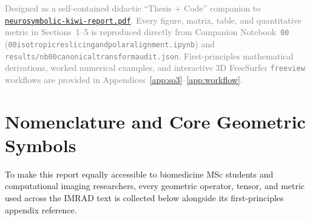 \documentclass[10pt,a4paper]{article}
\renewcommand{\_}{\origunderscore\allowbreak}
\newcommand{\ghblob}{https://github.com/arvidl/BMED365-2027/blob/main}
\newcommand{\repodir}{Lab4-Comp-Imag/Kiwi-challenge/docs/neurosymbolic-report}
\newcommand{\natrep}{\href{\ghblob/\repodir/neurosymbolic-kiwi-report.pdf}{\texttt{neurosymbolic-\allowbreak kiwi-\allowbreak report.pdf}}}
\begin{document}
\vfill
\begin{center}
\footnotesize\textcolor{gray}{
Designed as a self-contained didactic ``Thesis + Code'' companion to \natrep{}. Every figure, matrix, table, and quantitative metric in Sections~1--5 is reproduced directly from Companion Notebook~\texttt{00} (\texttt{00\_isotropic\_reslicing\_and\_polar\_alignment.ipynb}) and \texttt{results/nb00\_canonical\_transform\_audit.json}. First-principles mathematical derivations, worked numerical examples, and interactive 3D FreeSurfer \texttt{freeview} workflows are provided in Appendices~\ref{app:so3}--\ref{app:workflow}.
}
\end{center}

\clearpage
\tableofcontents
\vspace{0.75cm}
\listoffigures
\vspace{0.55cm}
\listoftables

\clearpage
\section*{Nomenclature and Core Geometric Symbols}

To make this report equally accessible to biomedicine MSc students and computational imaging researchers, every geometric operator, tensor, and metric used across the IMRAD text is collected below alongside its first-principles appendix reference.
\end{document}

